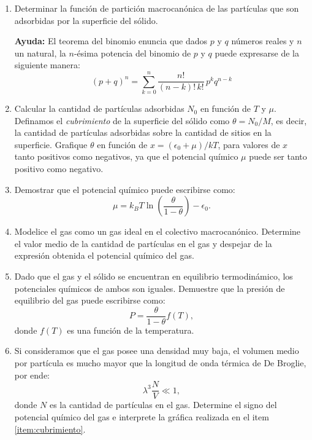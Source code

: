\documentclass[a4paper,11pt]{article}
\begin{document}
\begin{enumerate}[label=(\alph*),
                  leftmargin=2\parindent,
                  rightmargin=2\parindent]

    \item{Determinar la función de partición macrocanónica de las
          partículas que son adsorbidas por la superficie del sólido.}

    {\small
    \textbf{Ayuda:}
    El teorema del binomio enuncia que dados $p$ y $q$ números reales y $n$ un
    natural, la $n$-ésima potencia del binomio de $p$ y $q$ puede expresarse
    de la siguiente manera:
    $$ (p + q)^n = \sum_{k=0}^n \frac{n!}{(n-k)! \, k!} \, p^k q^{n-k} $$
    }

    \item{\label{item:cubrimiento}
          Calcular la cantidad de partículas adsorbidas $N_0$ en función de
          $T$ y $\mu$.
          Definamos el \emph{cubrimiento} de la superficie del sólido como
          $\theta = N_0/M$, es decir, la cantidad de partículas adsorbidas
          sobre la cantidad de sitios en la superficie.
          Grafique $\theta$ en función de $x = (\epsilon_0 + \mu)/kT$, para
          valores de $x$ tanto positivos como negativos, ya que el potencial
          químico $\mu$ puede ser tanto positivo como negativo.}

    \item{Demostrar que el potencial químico puede escribirse
          como:
          $$
          \mu =
          k_B T \ln \left( \frac{\theta}{1 - \theta} \right) - \epsilon_0.
          $$
          }

    \item{Modelice el gas como un gas ideal en el colectivo macrocanónico.
          Determine el valor medio de la cantidad de partículas en el gas y
          despejar de la expresión obtenida el potencial químico del gas.
          }

    \item{Dado que el gas y el sólido se encuentran en equilibrio
          termodinámico, los potenciales químicos de ambos son iguales.
          Demuestre que la presión de equilibrio del gas puede escribirse
          como:
          $$ P = \frac{\theta}{1 - \theta} f(T), $$
          donde $f(T)$ es una función de la temperatura.
          }

    \item{Si consideramos que el gas posee una densidad muy baja, el volumen
          medio por partícula es mucho mayor que la longitud de onda térmica
          de De Broglie, por ende:
          $$ \lambda^3 \frac{N}{V} \ll 1, $$
          donde $N$ es la cantidad de partículas en el gas.
          Determine el signo del potencial químico del gas e interprete la
          gráfica realizada en el item \ref{item:cubrimiento}. }

\end{enumerate}
\end{document}

